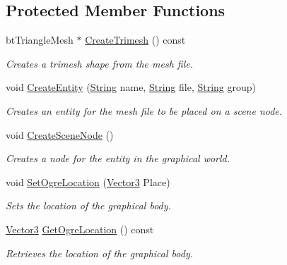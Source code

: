 \subsection*{Protected Member Functions}
\begin{DoxyCompactItemize}
\item 
btTriangleMesh $\ast$ \hyperlink{classphys_1_1ActorBase_af869b78fcac01ee153d495953daab382}{CreateTrimesh} () const 
\begin{DoxyCompactList}\small\item\em Creates a trimesh shape from the mesh file. \item\end{DoxyCompactList}\item 
void \hyperlink{classphys_1_1ActorBase_aff7dbb190fb982a43123bee3066501c4}{CreateEntity} (\hyperlink{namespacephys_aa03900411993de7fbfec4789bc1d392e}{String} name, \hyperlink{namespacephys_aa03900411993de7fbfec4789bc1d392e}{String} file, \hyperlink{namespacephys_aa03900411993de7fbfec4789bc1d392e}{String} group)
\begin{DoxyCompactList}\small\item\em Creates an entity for the mesh file to be placed on a scene node. \item\end{DoxyCompactList}\item 
void \hyperlink{classphys_1_1ActorBase_a125d6f0a0b4072e64490638c074eea2d}{CreateSceneNode} ()
\begin{DoxyCompactList}\small\item\em Creates a node for the entity in the graphical world. \item\end{DoxyCompactList}\item 
void \hyperlink{classphys_1_1ActorBase_a192ced7c3191f3f9d4921aad73952046}{SetOgreLocation} (\hyperlink{classphys_1_1Vector3}{Vector3} Place)
\begin{DoxyCompactList}\small\item\em Sets the location of the graphical body. \item\end{DoxyCompactList}\item 
\hyperlink{classphys_1_1Vector3}{Vector3} \hyperlink{classphys_1_1ActorBase_a12ef0a2625e2fdf506ea8e23e0a378fa}{GetOgreLocation} () const 
\begin{DoxyCompactList}\small\item\em Retrieves the location of the graphical body. \item\end{DoxyCompactList}\item 

\end{DoxyCompactItemize}
